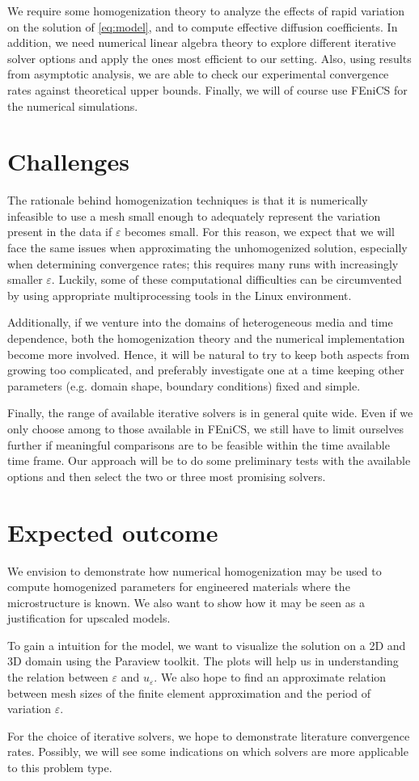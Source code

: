 \documentclass{article}
\renewcommand{\epsilon}{\varepsilon}
\begin{document}
We require some homogenization theory to analyze the effects of rapid variation on the solution of \eqref{eq:model}, and to compute effective diffusion coefficients.
In addition, we need numerical linear algebra theory to explore different iterative solver options and apply the ones most efficient to our setting.
Also, using results from asymptotic analysis, we are able to check our experimental convergence rates against theoretical upper bounds. Finally, we will of course use FEniCS for the numerical simulations.

\section{Challenges}
\label{sec:challenges}
The rationale behind homogenization techniques is that it is numerically infeasible to use a mesh small enough to adequately represent the variation present in the data if $\epsilon$ becomes small.
For this reason, we expect that we will face the same issues when approximating the unhomogenized solution, especially when determining convergence rates; this requires many runs with increasingly smaller $\epsilon$. Luckily, some of these computational difficulties can be circumvented by using appropriate multiprocessing tools in the Linux environment.

Additionally, if we venture into the domains of heterogeneous media and time dependence, both the homogenization theory and the numerical implementation become more involved. Hence, it will be natural to try to keep both aspects from growing too complicated, and preferably investigate one at a time keeping other parameters (e.g. domain shape, boundary conditions) fixed and simple.

Finally, the range of available iterative solvers is in general quite wide. Even if we only choose among to those available in FEniCS, we still have to limit ourselves further if meaningful comparisons are to be feasible within the time available time frame. Our approach will be to do some preliminary tests with the available options and then select the two or three most promising solvers.
\section{Expected outcome}
\label{sec:expected_outcome}
We envision to demonstrate how numerical homogenization may be used to compute homogenized parameters for engineered materials where the microstructure is known. We also want to show how it may be seen as a justification for upscaled models.

To gain a intuition for the model, we want to visualize the solution on a 2D and 3D domain using the Paraview toolkit.
The plots will help us in understanding the relation between $\epsilon$ and $u_\varepsilon$.
We also hope to find an approximate relation between mesh sizes of the finite element approximation and the period of variation $\varepsilon$.

For the choice of iterative solvers, we hope to demonstrate literature convergence rates. Possibly, we will see some indications on which solvers are more applicable to this problem type.
\end{document}
